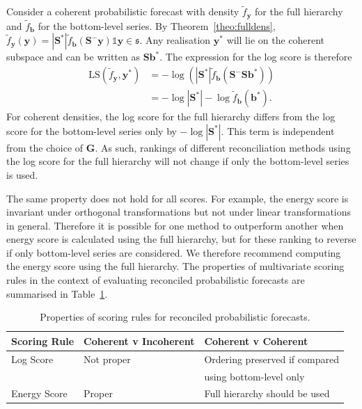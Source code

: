 \documentclass[12pt]{article}
\theoremstyle{definition}
\begin{document}
Consider a coherent probabilistic forecast with density $\tilde{f}_{\bm{y}}$ for the full hierarchy and $\tilde{f}_{\bm{b}}$ for the bottom-level series. By Theorem~\ref{theo:fulldens}, $\tilde{f}_{\bm{y}}(\bm{y})=|\bm{S}^*|\tilde{f}_{\bm{b}}(\bm{S}^-\bm{y})\mathbb{1}{\bm{y}\in\mathfrak{s}}$.  Any realisation $\bm{y}^*$ will lie on the coherent subspace and can be written as $\bm{S}\bm{b}^*$.  The expression for the log score is therefore
\begin{align}
\text{LS}(\tilde{f}_{\bm y},\bm{y}^*)&=-\log\left(|\bm{S}^*|\tilde{f}_{\bm{b}}(\bm{S}^-\bm{S}\bm{b}^*)\right)\nonumber\\
&=-\log|\bm{S}^*|-\log \tilde{f}_{\bm{b}}(\bm{b}^*).\nonumber
\end{align}
For coherent densities, the log score for the full hierarchy differs from the log score for the bottom-level series only by $-\log|\bm{S}^*|$. This term is independent from the choice of ${\bm G}$. As such, rankings of different reconciliation methods using the log score for the full hierarchy will not change if only the bottom-level series is used.

The same property does not hold for all scores. For example, the energy score is invariant under orthogonal transformations \citep{Szekely2013} but not under linear transformations in general. Therefore it is possible for one method to outperform another when energy score is calculated using the full hierarchy, but for these ranking to reverse if only bottom-level series are considered.  We therefore recommend computing the energy score using the full hierarchy.  The properties of multivariate scoring rules in the context of evaluating reconciled probabilistic forecasts are summarised in Table~\ref{tab:prop}.

\begin{table}
	\caption{Properties of scoring rules for reconciled probabilistic forecasts.}\label{tab:ScoringRulesProperties}
	\centering
	\begin{tabular}{lll}\hline
		Scoring Rule& Coherent v Incoherent &Coherent v Coherent\\
		\hline
		Log Score & Not proper & Ordering preserved if compared \\ && using bottom-level only\\
		Energy Score & Proper & Full hierarchy should be used\\
		\hline
	\end{tabular}
	
	\label{tab:prop}
\end{table}
\end{document}
